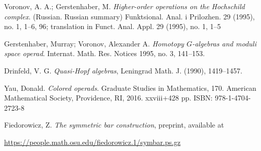 \documentclass[TFM.tex]{subfiles}
\begin{document}
\begin{thebibliography}{}
 Voronov, A. A.; Gerstenhaber, M.
\emph{Higher-order operations on the Hochschild complex}. (Russian. Russian summary) 
Funktsional. Anal. i Prilozhen. 29 (1995), no. 1, 1--6, 96; translation in 
Funct. Anal. Appl. 29 (1995), no. 1, 1–5 
 
  Gerstenhaber, Murray; Voronov, Alexander A. \emph{Homotopy $G$-algebras and moduli space operad}. Internat. Math. Res. Notices 1995, no. 3, 141–153.
 
 Drinfeld, V. G. \emph{Quasi-Hopf algebras}, Leningrad Math. J. (1990), 1419–1457.






 Yau, Donald. \emph{Colored operads}. Graduate Studies in Mathematics, 170. American Mathematical Society, Providence, RI, 2016. xxviii+428 pp. ISBN: 978-1-4704-2723-8


 Fiedorowicz, Z. \emph{The symmetric bar construction}, preprint, available at 

\url{https://people.math.osu.edu/fiedorowicz.1/symbar.ps.gz}









\end{thebibliography}
\end{document}
